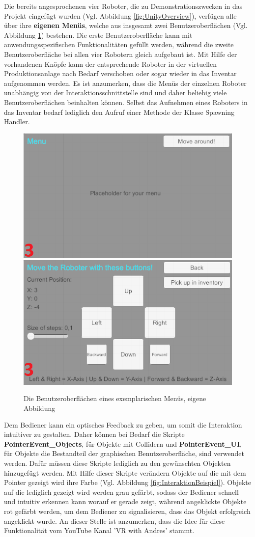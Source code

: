 Die bereits angesprochenen vier Roboter, die zu Demonstrationszwecken in das Projekt eingefügt wurden (Vgl. Abbildung \ref{fig:UnityOverview}), verfügen alle über ihre \textbf{eigenen Menüs}, welche aus insgesamt zwei Benutzeroberflächen (Vgl. Abbildung \ref{fig:BspMenu}) bestehen. Die erste Benutzeroberfläche kann mit anwendungsspezifischen Funktionalitäten gefüllt werden, während die zweite Benutzeroberfläche bei allen vier Robotern gleich aufgebaut ist. Mit Hilfe der vorhandenen Knöpfe kann der entsprechende Roboter in der virtuellen Produktionsanlage nach Bedarf verschoben oder sogar wieder in das Inventar aufgenommen werden. Es ist anzumerken, dass die Menüs der einzelnen Roboter unabhängig von der Interaktionsschnittstelle sind und daher beliebig viele Benutzeroberflächen beinhalten können. Selbst das Aufnehmen eines Roboters in das Inventar bedarf lediglich den Aufruf einer Methode der Klasse Spawning Handler.
\begin{figure}[h]
	\centering
	\includegraphics[width=0.45\linewidth]{Bilder/A52_OM1_2}
	\includegraphics[width=0.45\linewidth]{Bilder/A53_OM2_2}
	\caption{Die Benutzeroberflächen eines exemplarischen Menüs, eigene Abbildung}
	\label{fig:BspMenu}
\end{figure}
\newline
Dem Bediener kann ein optisches Feedback zu geben, um somit die Interaktion intuitiver zu gestalten. Daher können bei Bedarf die Skripte \textbf{PointerEvent\_Objects}, für Objekte mit Collidern und \textbf{PointerEvent\_UI}, für Objekte die Bestandteil der graphischen Benutzeroberfläche, sind verwendet werden. Dafür müssen diese Skripte lediglich zu den gewünschten Objekten hinzugefügt werden. Mit Hilfe dieser Skripte verändern Objekte auf die mit dem Pointer gezeigt wird ihre Farbe (Vgl. Abbildung \ref{fig:InteraktionBeispiel}). Objekte auf die lediglich gezeigt wird werden grau gefärbt, sodass der Bediener schnell und intuitiv erkennen kann worauf er gerade zeigt, während angeklickte Objekte rot gefärbt werden, um dem Bediener zu signalisieren, dass das Objekt erfolgreich angeklickt wurde. An dieser Stelle ist anzumerken, dass die Idee für diese Funktionalität vom YouTube Kanal 'VR with Andres' \cite{32} stammt.
\newpage

